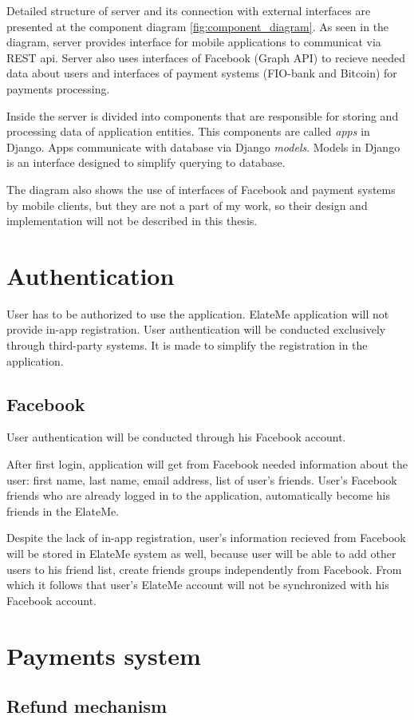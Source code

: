 Detailed structure of server and its connection with external interfaces are presented at the component diagram
\ref{fig:component_diagram}. As seen in the diagram, server provides interface for mobile applications to communicat via
REST api. Server also uses interfaces of Facebook (Graph API) to recieve needed data about users and interfaces of
payment systems (FIO-bank and Bitcoin) for payments processing.

Inside the server is divided into components that are responsible for storing and processing data of application
entities. This components are called \textit{apps} in Django. Apps communicate with database via Django \textit{models}.
Models in Django is an interface designed to simplify querying to database.


The diagram also shows the use of interfaces of Facebook and payment systems by mobile clients, but they are not a part
of my work, so their design and implementation will not be described in this thesis.



\section{Authentication}
User has to be authorized to use the application. ElateMe application will not provide in-app registration. User
authentication will be conducted exclusively through third-party systems. It is made to simplify the
registration in the application.


\subsection{Facebook}
User authentication will be conducted through his Facebook account.

After first login, application will get from Facebook needed information about the user: first name, last name,
email address, list of user's friends. User's Facebook friends who are already logged in to the application,
automatically become his friends in the ElateMe.

Despite the lack of in-app registration, user's information recieved from Facebook will be stored in ElateMe system
as well, because user will be able to add other users to his friend list, create friends groups independently from
Facebook. From which it follows that user's ElateMe account will not be synchronized with his Facebook account.


\section{Payments system}




\subsection{Refund mechanism}













